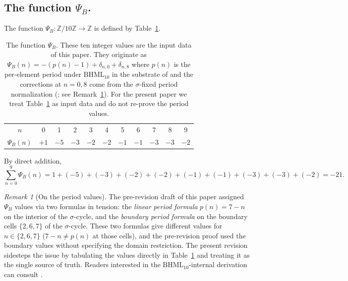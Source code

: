 \documentclass[11pt,reqno]{amsart}
\theoremstyle{plain}
\theoremstyle{definition}
\theoremstyle{remark}
\newtheorem*{remark}{Remark}
\newcommand{\Z}{\mathbb{Z}}
\newcommand{\BH}{\mathrm{BHML}}
\newcommand{\sig}{\sigma}
\begin{document}
\subsection{The function $\Psi_B$.}
The function $\Psi_B : \Z/10\Z \to \Z$ is defined by
Table~\ref{tab:psi-b}.

\begin{table}[h]
\centering
\caption{The function $\Psi_B$.  These ten integer values are the
input data of this paper.  They originate as
$\Psi_B(n) = -(p(n) - 1) + \delta_{n, 0} + \delta_{n, 8}$ where $p(n)$
is the per-element period under $\BH_{10}$ in the substrate of
\cite{SandersGishFourCore} and the corrections at $n = 0, 8$ come
from the $\sig$-fixed period normalization
(\cite[Cor.~2.2 and Thm.~5.1]{SandersBridgeWP9}; see
Remark~\ref{rem:periods}).
For the present paper we treat Table~\ref{tab:psi-b} as input data and
do not re-prove the period values.}
\label{tab:psi-b}
\begin{tabular}{c|cccccccccc}
\toprule
$n$           & 0 & 1 & 2 & 3 & 4 & 5 & 6 & 7 & 8 & 9 \\
$\Psi_B(n)$   & $+1$ & $-5$ & $-3$ & $-2$ & $-2$ & $-1$ & $-1$ & $-3$ & $-3$ & $-2$ \\
\bottomrule
\end{tabular}
\end{table}

By direct addition,
\[
\sum_{n=0}^{9} \Psi_B(n) = 1 + (-5) + (-3) + (-2) + (-2) + (-1) + (-1) + (-3) + (-3) + (-2) = -21.
\]

\begin{remark}[On the period values]\label{rem:periods}
The pre-revision draft of this paper assigned $\Psi_B$ values via
two formulas in tension: the \emph{linear period formula}
$p(n) = 7 - n$ on the interior of the $\sig$-cycle, and the
\emph{boundary period formula} \cite[Cor.~2.2]{SandersBridgeWP9}
on the boundary cells $\{2, 6, 7\}$ of the $\sig$-cycle.
These two formulas give different values for $n \in \{2, 6, 7\}$
($7-n \neq p(n)$ at those cells), and the pre-revision proof used
the boundary values without specifying the domain restriction.
The present revision sidesteps the issue by tabulating the values
directly in Table~\ref{tab:psi-b} and treating it as the single
source of truth.  Readers interested in the $\BH_{10}$-internal
derivation can consult \cite[\S 2 and \S 5]{SandersBridgeWP9}.
\end{remark}
\end{document}
